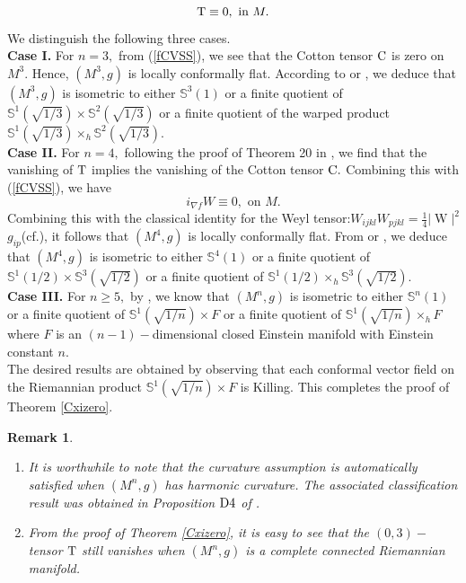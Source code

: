 \documentclass[10pt,leqno,oneside]{amsart}
\newtheorem{Rmk}{Remark}
\begin{document}
{         \[{\rm T}\equiv0,\text{~in~} M.\]
         We distinguish the following three cases.\\
         {\bf Case I.} For $n=3,$ from (\ref{fCVSS}), we see that the Cotton tensor $\rm C$ is zero on $M^3$. Hence, $(M^3 ,g)$ is locally conformally flat. According to \cite[Theorem 3.5]{Kobayashi1982} or \cite[Theorem C1]{Lafontaine1983}, we deduce that $(M^3, g)$ is isometric to either $\mathbb S^3(1)$ or a finite quotient of $\mathbb S^1(\sqrt{1/3})\times\mathbb S^2(\sqrt{1/3})$ or a finite quotient of the warped product $\mathbb S^1(\sqrt{1/3})\times_h \mathbb{S}^{2}(\sqrt{1/3}).$\\
         {\bf Case II.} For $n=4,$ following the proof of Theorem 20 in \cite{Jian2023}, we find that the vanishing of $\rm T$ implies the vanishing of the Cotton tensor $\rm C.$ Combining this with (\ref{fCVSS}), we have
         \[i_{\nabla f}W\equiv0,\text{~on~} M.\]
         Combining this with the classical identity for the Weyl tensor:$W_{ijkl}W_{pjkl}=\frac{1}{4}|\operatorname W|^{2}$ $ g_{ip}$(cf.\cite[p.413]{Derdzinski1983}), it follows that $(M^4, g)$ is locally conformally flat. From \cite[Theorem 3.5]{Kobayashi1982} or \cite[Theorem C1]{Lafontaine1983}, we deduce that $(M^4, g)$ is isometric to either $\mathbb S^4(1)$ or a finite quotient of $\mathbb S^1(1/2)\times\mathbb S^{3}(\sqrt{1/2})$ or a finite quotient of $\mathbb S^1(1/2)\times_h\mathbb S^{3}(\sqrt{1/2}).$\\
         {\bf Case III.} For $n\ge5,$ by \cite{QingYuan2013}, we know that $(M^n, g)$ is isometric to either $\mathbb S^n(1)$ or a finite quotient of $\mathbb S^1(\sqrt{1/n})\times F$ or a finite quotient of $\mathbb S^1(\sqrt{1/n})\times_h F$ where $F$ is an $(n-1)-$dimensional closed Einstein manifold with Einstein constant $n.$\\ The desired results are obtained by observing that each conformal vector field on the Riemannian product $\mathbb S^1(\sqrt{1/n})\times F $ is Killing. This completes the proof of Theorem \ref{Cxizero}.

    \begin{Rmk}
         \begin{enumerate}[leftmargin=0.5cm, itemindent=0.4cm]
           \item[{\rm(1)}.] It is worthwhile to note that the curvature assumption is automatically satisfied when $(M^n, g)$ has harmonic curvature. The associated classification result was obtained in Proposition ${\rm D4}$ of {\rm\cite{Lafontaine1983}}.
           \item[{\rm(2)}.] From the proof of Theorem {\rm\ref{Cxizero}}, it is easy to see that the $(0,3)-$tensor ${\rm T}$ still vanishes when $(M^n, g)$ is a complete connected Riemannian manifold.
         \end{enumerate}
    \end{Rmk}

}
\end{document}
